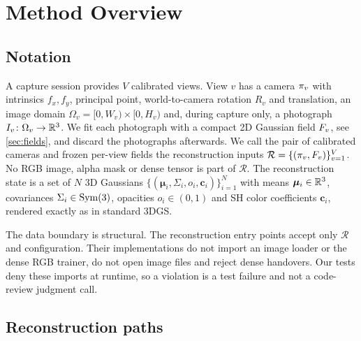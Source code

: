 \section{Method Overview}
\label{sec:overview}

\subsection{Notation}
\label{sec:notation}

A capture session provides $V$ calibrated views.  View $v$ has a camera $\pi_v$ with
intrinsics $f_x, f_y$, principal point, world-to-camera rotation $R_v$ and translation, an
image domain $\Omega_v = [0, W_v) \times [0, H_v)$ and, during capture only, a photograph
$I_v \colon \Omega_v \to \mathbb{R}^3$.  We fit each photograph with a compact 2D Gaussian field
$F_v$, see \cref{sec:fields}, and discard the photographs afterwards.  We call the
pair of calibrated cameras and frozen per-view fields the reconstruction inputs
$\mathcal{R} = \{(\pi_v, F_v)\}_{v=1}^{V}$.  No RGB image, alpha mask or dense
tensor is part of $\mathcal{R}$.  The reconstruction state is a set of $N$ 3D Gaussians
$\{(\bm{\mu}_i, \Sigma_i, o_i, \bm{c}_i)\}_{i=1}^{N}$ with means $\bm{\mu}_i \in \mathbb{R}^3$,
covariances $\Sigma_i \in \operatorname{Sym}(3)$, opacities $o_i \in (0,1)$ and SH color coefficients
$\bm{c}_i$, rendered exactly as in standard 3DGS.

The data boundary is structural.  The reconstruction entry points accept only
$\mathcal{R}$ and configuration.  Their implementations do not import an image loader or
the dense RGB trainer, do not open image files and reject dense handovers.  Our tests deny
these imports at runtime, so a violation is a test failure and not a code-review judgment
call.

\subsection{Reconstruction paths}
\label{sec:paths}

